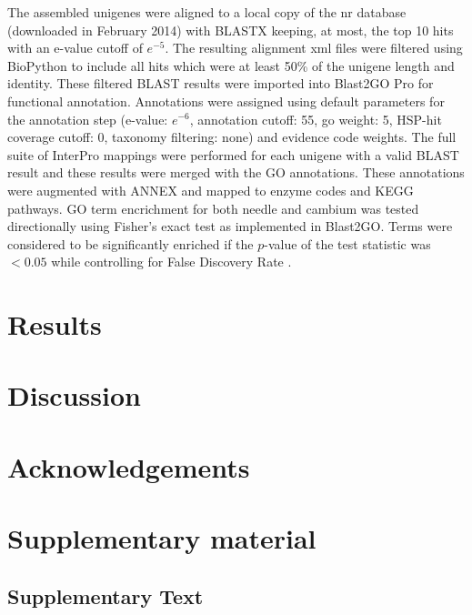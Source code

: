 \documentclass[11pt]{article}
\newcommand{\beginsupplement}{%
        \setcounter{table}{0}
        \renewcommand{\thetable}{S\arabic{table}}
        \setcounter{figure}{0}
        \renewcommand{\thefigure}{S\arabic{figure}}
        \renewcommand{\thesection}{S\arabic{section}}
        \renewcommand{\thesubsection}{S\arabic{subsection}} 
     }
\begin{document}
The assembled unigenes were aligned to a local copy of the nr database
(downloaded in February 2014) with BLASTX \citep{citeulike:238188}
keeping, at most, the top 10 hits with an e-value cutoff of
$e^{-5}$. The resulting alignment xml files were filtered using
BioPython \citep[v.\ 1.6.4]{citeulike:4202607} to include all hits
which were at least 50\% of the unigene length and identity.  These
filtered BLAST results were imported into Blast2GO Pro \citep[v.\
2.7.2, bg2\_may14]{citeulike:2733895} for functional annotation.
Annotations were assigned using default parameters for the annotation
step (e-value: $e^{-6}$, annotation cutoff: 55, go weight: 5, HSP-hit
coverage cutoff: 0, taxonomy filtering: none) and evidence code
weights. The full suite of InterPro \citep{citeulike:12942060}
mappings were performed for each unigene with a valid BLAST result and
these results were merged with the GO annotations.  These annotations
were augmented with ANNEX \citep{annex} and mapped to enzyme codes and
KEGG \citep{citeulike:9172127} pathways. GO term encrichment for both
needle and cambium was tested directionally using Fisher's exact test
as implemented in Blast2GO.  Terms were considered to be significantly
enriched if the $p$-value of the test statistic was $<0.05$ while
controlling for False Discovery Rate
\citep[FDR,][]{benjamini1995controlling}.

\section*{Results}

\section*{Discussion}

\section*{Acknowledgements}

\clearpage

\singlespacing



\clearpage

\clearpage

\clearpage

\beginsupplement

\section*{Supplementary material}

\subsection*{Supplementary Text}\label{ss:supp}
\end{document}
